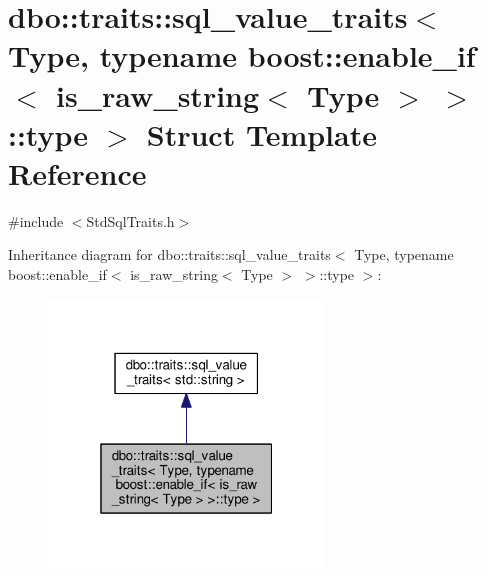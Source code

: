 \hypertarget{structdbo_1_1traits_1_1sql__value__traits_3_01_type_00_01typename_01boost_1_1enable__if_3_01is__aa5117fa5e949e5d70ea0660f0e85288}{\section{dbo\+:\+:traits\+:\+:sql\+\_\+value\+\_\+traits$<$ Type, typename boost\+:\+:enable\+\_\+if$<$ is\+\_\+raw\+\_\+string$<$ Type $>$ $>$\+:\+:type $>$ Struct Template Reference}
\label{structdbo_1_1traits_1_1sql__value__traits_3_01_type_00_01typename_01boost_1_1enable__if_3_01is__aa5117fa5e949e5d70ea0660f0e85288}
}


{\ttfamily \#include $<$Std\+Sql\+Traits.\+h$>$}



Inheritance diagram for dbo\+:\+:traits\+:\+:sql\+\_\+value\+\_\+traits$<$ Type, typename boost\+:\+:enable\+\_\+if$<$ is\+\_\+raw\+\_\+string$<$ Type $>$ $>$\+:\+:type $>$\+:\nopagebreak
\begin{figure}[H]
\begin{center}
\leavevmode
\includegraphics[width=208pt]{structdbo_1_1traits_1_1sql__value__traits_3_01_type_00_01typename_01boost_1_1enable__if_3_01is__5d4dab5346be40a7d7320f9b0590a003}
\end{center}
\end{figure}


